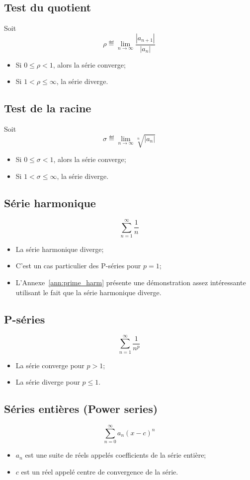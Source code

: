 \subsection{Test du quotient}
Soit
\[ \rho \eqdef \lim_{n \to \infty} \frac{|a_{n+1}|}{|a_n|} \]
\begin{itemize}
  \item Si $0 \leq \rho < 1$, alors la série converge;
  \item Si $1 < \rho \leq \infty$, la série diverge.
\end{itemize}

\subsection{Test de la racine}
Soit
\[ \sigma \eqdef \lim_{n \to \infty} \sqrt[n]{|a_n|} \]
\begin{itemize}
  \item Si $0 \leq \sigma < 1$, alors la série converge;
  \item Si $1 < \sigma \leq \infty$, la série diverge.
\end{itemize}

\subsection{Série harmonique}
\[ \sum_{n = 1}^{\infty} \frac{1}{n} \]
\begin{itemize}
  \item La série harmonique diverge;
  \item C'est un cas particulier des P-séries pour $p = 1$;
  \item L'Annexe~\ref{ann:prime_harm} présente
    une démonstration assez intéressante utilisant
    le fait que la série harmonique diverge.
\end{itemize}

\subsection{P-séries}
\[ \sum_{n = 1}^{\infty} \frac{1}{n^p} \]
\begin{itemize}
  \item La série converge pour $p > 1$;
  \item La série diverge pour $p \leq 1$.
\end{itemize}

\subsection{Séries entières (Power series)}
\[ \sum_{n =0}^{\infty}  a_n(x - c)^n \]
\begin{itemize}
  \item $a_n$ est une suite de réels appelés coefficients de la série entière;
  \item $c$ est un réel appelé centre de convergence de la série.
\end{itemize}


